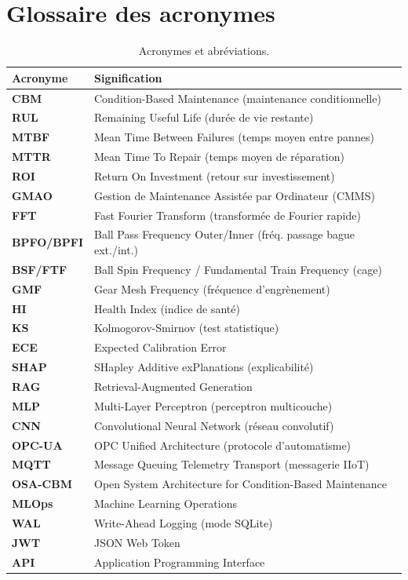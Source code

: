 \section{Glossaire des acronymes}
\begin{table}[h]
\centering\small
\caption{Acronymes et abréviations.}
\label{tab:acronymes}
\begin{tabular}{>{\bfseries}l p{10.5cm}}
\toprule
Acronyme & Signification \\
\midrule
CBM & Condition-Based Maintenance (maintenance conditionnelle) \\
RUL & Remaining Useful Life (durée de vie restante) \\
MTBF & Mean Time Between Failures (temps moyen entre pannes) \\
MTTR & Mean Time To Repair (temps moyen de réparation) \\
ROI & Return On Investment (retour sur investissement) \\
GMAO & Gestion de Maintenance Assistée par Ordinateur (CMMS) \\
FFT & Fast Fourier Transform (transformée de Fourier rapide) \\
BPFO/BPFI & Ball Pass Frequency Outer/Inner (fréq. passage bague ext./int.) \\
BSF/FTF & Ball Spin Frequency / Fundamental Train Frequency (cage) \\
GMF & Gear Mesh Frequency (fréquence d'engrènement) \\
HI & Health Index (indice de santé) \\
KS & Kolmogorov-Smirnov (test statistique) \\
ECE & Expected Calibration Error \\
SHAP & SHapley Additive exPlanations (explicabilité) \\
RAG & Retrieval-Augmented Generation \\
MLP & Multi-Layer Perceptron (perceptron multicouche) \\
CNN & Convolutional Neural Network (réseau convolutif) \\
OPC-UA & OPC Unified Architecture (protocole d'automatisme) \\
MQTT & Message Queuing Telemetry Transport (messagerie IIoT) \\
OSA-CBM & Open System Architecture for Condition-Based Maintenance \\
MLOps & Machine Learning Operations \\
WAL & Write-Ahead Logging (mode SQLite) \\
JWT & JSON Web Token \\
API & Application Programming Interface \\
\bottomrule
\end{tabular}
\end{table}
